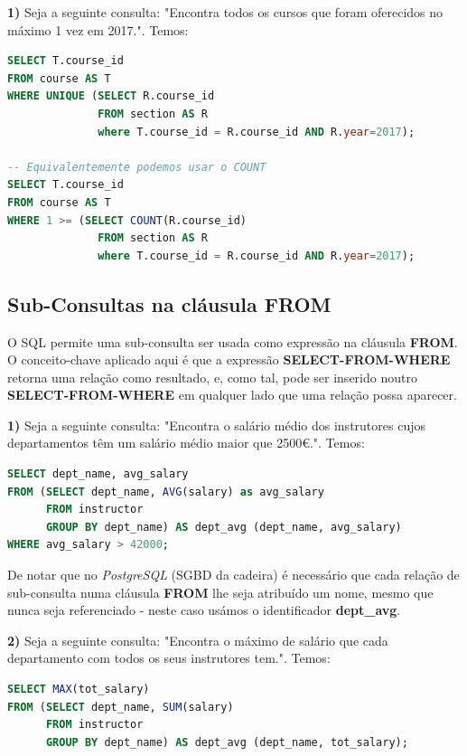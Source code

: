\documentclass[oneside]{book}
\theoremstyle{definition}
\begin{document}
\textbf{1)} Seja a seguinte consulta: "Encontra todos os cursos que foram oferecidos no máximo 1 vez em 2017.". Temos:
\begin{lstlisting}[language=SQL, morekeywords={REFERENCES, REFRESH, MATERIALIZED, CONCURRENTLY}, framesep=8pt, xleftmargin=40pt, framexleftmargin=40pt, frame=tb, framerule=0pt]
SELECT T.course_id
FROM course AS T
WHERE UNIQUE (SELECT R.course_id
              FROM section AS R
              where T.course_id = R.course_id AND R.year=2017);
              
-- Equivalentemente podemos usar o COUNT
SELECT T.course_id
FROM course AS T
WHERE 1 >= (SELECT COUNT(R.course_id)
              FROM section AS R
              where T.course_id = R.course_id AND R.year=2017);
\end{lstlisting}

\subsection{Sub-Consultas na cláusula FROM}
O SQL permite uma sub-consulta ser usada como expressão na cláusula \textbf{FROM}. O conceito-chave aplicado aqui é que a expressão \textbf{SELECT-FROM-WHERE} retorna uma relação como resultado, e, como tal, pode ser inserido noutro \textbf{SELECT-FROM-WHERE} em qualquer lado que uma relação possa aparecer.

\textbf{1)} Seja a seguinte consulta: "Encontra o salário médio dos instrutores cujos departamentos têm um salário médio maior que 2500€.". Temos:
\begin{lstlisting}[language=SQL, morekeywords={REFERENCES, REFRESH, MATERIALIZED, CONCURRENTLY}, framesep=8pt, xleftmargin=40pt, framexleftmargin=40pt, frame=tb, framerule=0pt]
SELECT dept_name, avg_salary
FROM (SELECT dept_name, AVG(salary) as avg_salary
      FROM instructor
      GROUP BY dept_name) AS dept_avg (dept_name, avg_salary)
WHERE avg_salary > 42000;
\end{lstlisting}

De notar que no \textit{PostgreSQL} (SGBD da cadeira) é necessário que cada relação de sub-consulta numa cláusula \textbf{FROM} lhe seja atribuído um nome, mesmo que nunca seja referenciado - neste caso usámos o identificador \textbf{dept\_avg}.

\textbf{2)} Seja a seguinte consulta: "Encontra o máximo de salário que cada departamento com todos os seus instrutores tem.". Temos:
\begin{lstlisting}[language=SQL, morekeywords={REFERENCES, REFRESH, MATERIALIZED, CONCURRENTLY}, framesep=8pt, xleftmargin=40pt, framexleftmargin=40pt, frame=tb, framerule=0pt]
SELECT MAX(tot_salary)
FROM (SELECT dept_name, SUM(salary)
      FROM instructor
      GROUP BY dept_name) AS dept_avg (dept_name, tot_salary);
\end{lstlisting}
\end{document}
